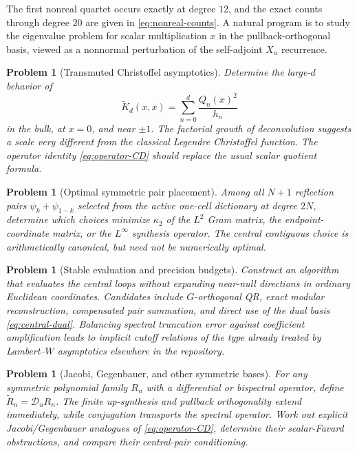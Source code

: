 \documentclass[11pt,oneside]{article}
\numberwithin{equation}{section}
\newtheorem{problem}[theorem]{Problem}
\theoremstyle{definition}
\theoremstyle{remark}
\newcommand{\Dscr}{\mathscr D_u}
\begin{document}
The first nonreal quartet occurs exactly at degree $12$, and the exact counts
through degree $20$ are given in \eqref{eq:nonreal-counts}.  A natural program
is to study the eigenvalue problem for scalar multiplication $x$ in the
pullback-orthogonal basis, viewed as a nonnormal perturbation of the
self-adjoint $X_u$ recurrence.

\begin{problem}[Transmuted Christoffel asymptotics]
Determine the large-$d$ behavior of
\[
 \widetilde K_d(x,x)=\sum_{n=0}^{d}\frac{Q_n(x)^2}{h_n}
\]
in the bulk, at $x=0$, and near $\pm1$.  The factorial growth of deconvolution
suggests a scale very different from the classical Legendre Christoffel
function.  The operator identity \eqref{eq:operator-CD} should replace the
usual scalar quotient formula.
\end{problem}

\begin{problem}[Optimal symmetric pair placement]
Among all $N+1$ reflection pairs $\psi_k+\psi_{1-k}$ selected from the active
one-cell dictionary at degree $2N$, determine which choices minimize
$\kappa_2$ of the $L^2$ Gram matrix, the endpoint-coordinate matrix, or the
$L^\infty$ synthesis operator.  The central contiguous choice is arithmetically
canonical, but need not be numerically optimal.
\end{problem}

\begin{problem}[Stable evaluation and precision budgets]
Construct an algorithm that evaluates the central loops without expanding
near-null directions in ordinary Euclidean coordinates.  Candidates include
$G$-orthogonal QR, exact modular reconstruction, compensated pair summation,
and direct use of the dual basis \eqref{eq:central-dual}.  Balancing spectral
truncation error against coefficient amplification leads to implicit cutoff
relations of the type already treated by Lambert--$W$ asymptotics elsewhere in
the repository.
\end{problem}

\begin{problem}[Jacobi, Gegenbauer, and other symmetric bases]
For any symmetric polynomial family $R_n$ with a differential or
bispectral operator, define $\widetilde R_n=\Dscr R_n$.  The finite up-synthesis
and pullback orthogonality extend immediately, while conjugation transports the
spectral operator.  Work out explicit Jacobi/Gegenbauer analogues of
\eqref{eq:operator-CD}, determine their scalar-Favard obstructions, and compare
their central-pair conditioning.
\end{problem}
\end{document}
